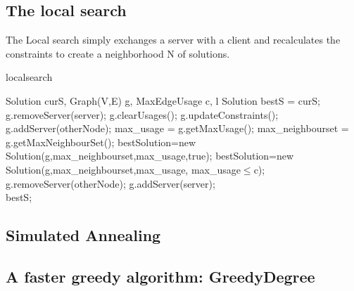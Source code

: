 \documentclass [12pt]{article}
\begin{document}
\subsection{The local search}
The Local search simply exchanges a server with a client and recalculates the constraints to create a neighborhood N of solutions.

\begin {algorithm} [H]
\caption {localsearch}
\label {localS}
\begin {algorithmic} [3]
\Require Solution curS, Graph(V,E) g, MaxEdgeUsage c, l 
\State        Solution bestS = curS;
  \State    g.removeServer(server);
      \State g.clearUsages();
      \State g.updateConstraints();
      \State g.addServer(otherNode);
      \State max\_usage = g.getMaxUsage();
      \State max\_neighbourset = g.getMaxNeighbourSet();
        \State bestSolution=new Solution(g,max\_neighbourset,max\_usage,true);
      \EndIf 
        \State bestSolution=new Solution(g,max\_neighbourset,max\_usage, max\_usage$\leq$c);
        \State g.removeServer(otherNode);
      \EndIf
      \EndIf
   \EndFor
   \State g.addServer(server);
\EndFor\\
    \Return  bestS;
\end {algorithmic}
\end {algorithm}


\subsection{Simulated Annealing}

\subsection{A faster greedy algorithm: GreedyDegree}
\end{document}
